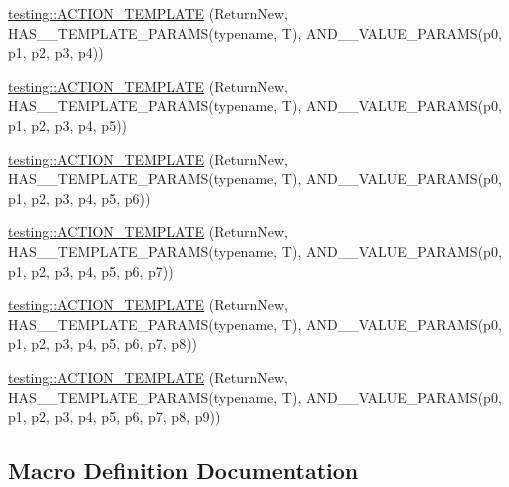 \begin{DoxyCompactItemize}
\item 
\hyperlink{namespacetesting_a0c03444379adfb849db243829946c1ed}{testing\+::\+A\+C\+T\+I\+O\+N\+\_\+\+T\+E\+M\+P\+L\+A\+TE} (Return\+New, H\+A\+S\+\_\+\_\+\+T\+E\+M\+P\+L\+A\+T\+E\+\_\+\+P\+A\+R\+A\+MS(typename, T), A\+N\+D\+\_\+\_\+\+V\+A\+L\+U\+E\+\_\+\+P\+A\+R\+A\+MS(p0, p1, p2, p3, p4))
\item 
\hyperlink{namespacetesting_a2ef1b31693ee2be0bb93602b375fb9ce}{testing\+::\+A\+C\+T\+I\+O\+N\+\_\+\+T\+E\+M\+P\+L\+A\+TE} (Return\+New, H\+A\+S\+\_\+\_\+\+T\+E\+M\+P\+L\+A\+T\+E\+\_\+\+P\+A\+R\+A\+MS(typename, T), A\+N\+D\+\_\+\_\+\+V\+A\+L\+U\+E\+\_\+\+P\+A\+R\+A\+MS(p0, p1, p2, p3, p4, p5))
\item 
\hyperlink{namespacetesting_a7b4cfa09367e9938561eeca5a105d183}{testing\+::\+A\+C\+T\+I\+O\+N\+\_\+\+T\+E\+M\+P\+L\+A\+TE} (Return\+New, H\+A\+S\+\_\+\_\+\+T\+E\+M\+P\+L\+A\+T\+E\+\_\+\+P\+A\+R\+A\+MS(typename, T), A\+N\+D\+\_\+\_\+\+V\+A\+L\+U\+E\+\_\+\+P\+A\+R\+A\+MS(p0, p1, p2, p3, p4, p5, p6))
\item 
\hyperlink{namespacetesting_a76d58331453ee0a2eb75a5992e35197b}{testing\+::\+A\+C\+T\+I\+O\+N\+\_\+\+T\+E\+M\+P\+L\+A\+TE} (Return\+New, H\+A\+S\+\_\+\_\+\+T\+E\+M\+P\+L\+A\+T\+E\+\_\+\+P\+A\+R\+A\+MS(typename, T), A\+N\+D\+\_\+\_\+\+V\+A\+L\+U\+E\+\_\+\+P\+A\+R\+A\+MS(p0, p1, p2, p3, p4, p5, p6, p7))
\item 
\hyperlink{namespacetesting_adfb5791a941ec1f2a2f8067fd9ac7667}{testing\+::\+A\+C\+T\+I\+O\+N\+\_\+\+T\+E\+M\+P\+L\+A\+TE} (Return\+New, H\+A\+S\+\_\+\_\+\+T\+E\+M\+P\+L\+A\+T\+E\+\_\+\+P\+A\+R\+A\+MS(typename, T), A\+N\+D\+\_\+\_\+\+V\+A\+L\+U\+E\+\_\+\+P\+A\+R\+A\+MS(p0, p1, p2, p3, p4, p5, p6, p7, p8))
\item 
\hyperlink{namespacetesting_a3934a47f6125504c939a3573b7fc55c4}{testing\+::\+A\+C\+T\+I\+O\+N\+\_\+\+T\+E\+M\+P\+L\+A\+TE} (Return\+New, H\+A\+S\+\_\+\_\+\+T\+E\+M\+P\+L\+A\+T\+E\+\_\+\+P\+A\+R\+A\+MS(typename, T), A\+N\+D\+\_\+\_\+\+V\+A\+L\+U\+E\+\_\+\+P\+A\+R\+A\+MS(p0, p1, p2, p3, p4, p5, p6, p7, p8, p9))
\end{DoxyCompactItemize}


\subsection{Macro Definition Documentation}
\mbox{\label{gmock-generated-actions_8h_a7af7137aa4871df4235881af377205fe}} 
